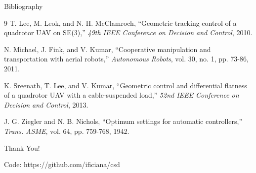 \documentclass{beamer}
\begin{document}
\begin{frame}{Bibliography}
\begin{thebibliography}{9}
T. Lee, M. Leok, and N. H. McClamroch,
``Geometric tracking control of a quadrotor UAV on SE(3),''
\textit{49th IEEE Conference on Decision and Control}, 2010.

N. Michael, J. Fink, and V. Kumar,
``Cooperative manipulation and transportation with aerial robots,''
\textit{Autonomous Robots}, vol. 30, no. 1, pp. 73-86, 2011.

K. Sreenath, T. Lee, and V. Kumar,
``Geometric control and differential flatness of a quadrotor UAV with a cable-suspended load,''
\textit{52nd IEEE Conference on Decision and Control}, 2013.

J. G. Ziegler and N. B. Nichols,
``Optimum settings for automatic controllers,''
\textit{Trans. ASME}, vol. 64, pp. 759-768, 1942.
\end{thebibliography}
\end{frame}

\begin{frame}
\begin{center}
\Huge Thank You!

\vspace{1.5cm}
\normalsize
Code: https://github.com/ificiana/csd
\end{center}
\end{frame}
\end{document}
